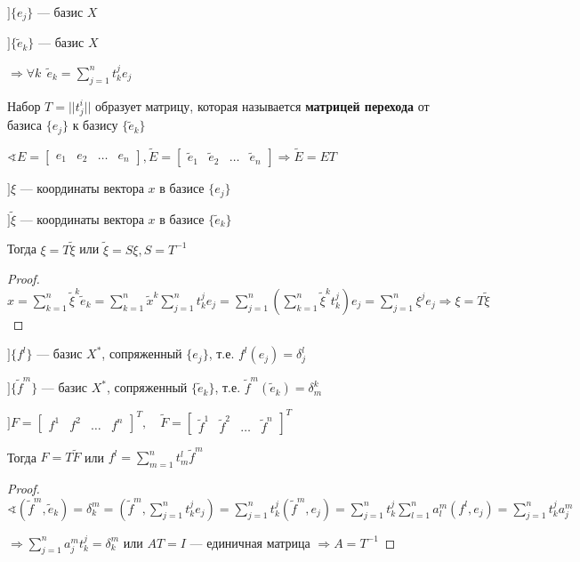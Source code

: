 $] \{e_j\}$ --- базис $X$

$] \{\tilde e_k\}$ --- базис $X$

$\Rightarrow \forall k \ \ \tilde e_k=\sum_{j=1}^n t_k^je_j$

\begin{definition}
    Набор $T=||t_j^i||$ образует матрицу, которая называется \textbf{матрицей перехода} от базиса $\{e_j\}$ к базису $\{\tilde e_k\}$
\end{definition}

\begin{remark}
    $\sphericalangle E=\begin{bmatrix}
        e_1 & e_2 & \ldots & e_n
    \end{bmatrix}, \tilde E=\begin{bmatrix}
        \tilde e_1 & \tilde e_2 & \ldots & \tilde e_n
    \end{bmatrix} \Rightarrow \tilde E = ET$
\end{remark}

\begin{lemma}
    $] \xi$ --- координаты вектора $x$ в базисе $\{e_j\}$
    
    $] \tilde \xi$ --- координаты вектора $x$ в базисе $\{\tilde e_k\}$

    Тогда $\xi=T\tilde\xi$ или $\tilde \xi = S \xi, S=T^{-1}$
\end{lemma}
\begin{proof}
    $x=\sum\limits_{k=1}^n\tilde\xi^k \tilde e_k = \sum\limits_{k=1}^n \tilde x^k \sum\limits_{j=1}^n t_k^j e_j=\sum\limits_{j=1}^n (\sum\limits_{k=1}^n \tilde \xi^k t_k^j)e_j=\sum\limits_{j=1}^n \xi^j e_j \Rightarrow \xi=T\tilde\xi$
\end{proof}

\begin{lemma}
    $] \{f^l\}$ --- базис $X^*$, сопряженный $\{e_j\}$, т.е. $f^l(e_j)=\delta_j^l$
    
    $] \{\tilde f^m\}$ --- базис $X^*$, сопряженный $\{\tilde e_k\}$, т.е. $\tilde f^m(\tilde e_k)=\delta_m^k$

    $] F=\begin{bmatrix}
        f^1 & f^2 & \ldots & f^n
    \end{bmatrix}^T,\quad \tilde F = \begin{bmatrix}
        \tilde f^1 & \tilde f^2 & \ldots & \tilde f^n
    \end{bmatrix}^T$

    Тогда $F=T \tilde F$ или $f^l=\sum\limits_{m=1}^n t^l_m \tilde f^m$
\end{lemma}
\begin{proof}
    $\sphericalangle (\tilde f^m, \tilde e_k)=\delta^m_k=(\tilde f^m, \sum\limits_{j=1}^n t_k^j e_j)=\sum\limits_{j=1}^n t_k^j (\tilde f^m, e_j)=\sum\limits_{j=1}^n t_k^j \sum\limits_{l=1}^n a_l^m (f^l, e_j)=\sum\limits_{j=1}^n t_k^j a_j^m$
    
    $\Rightarrow \sum\limits_{j=1}^n a_j^mt_k^j=\delta^m_k$ или $AT=I$ --- единичная матрица $\Rightarrow A=T^{-1}$
\end{proof}

